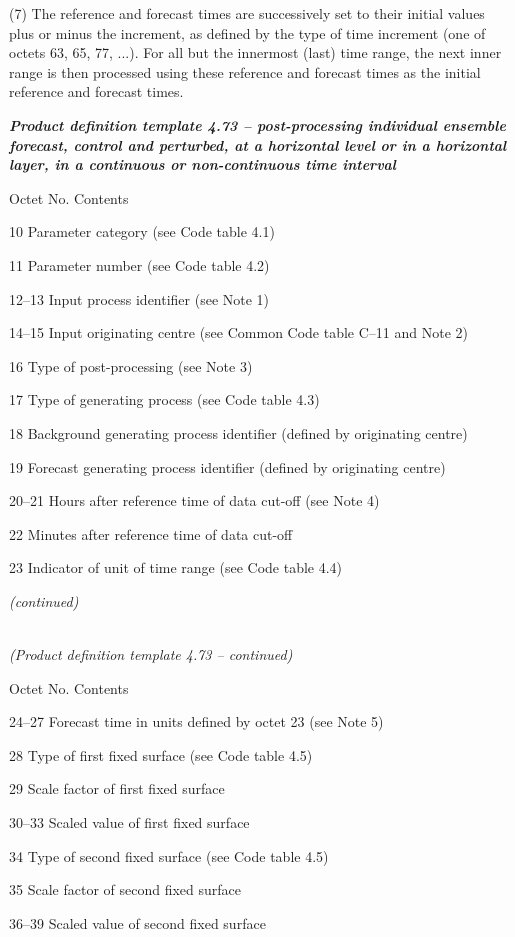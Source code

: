 (7) The reference and forecast times are successively set to their initial values plus or minus the increment, as defined by the type of time increment (one of octets 63, 65, 77, ...). For all but the innermost (last) time range, the next inner range is then processed using these reference and forecast times as the initial reference and forecast times.

\emph{\textbf{Product definition template 4.73 -- post-processing individual ensemble forecast, control and perturbed, at a horizontal level or in a horizontal layer, in a continuous or non-continuous time interval}}

Octet No. Contents

10 Parameter category (see Code table 4.1)

11 Parameter number (see Code table 4.2)

12--13 Input process identifier (see Note 1)

14--15 Input originating centre (see Common Code table C--11 and Note 2)

16 Type of post-processing (see Note 3)

17 Type of generating process (see Code table 4.3)

18 Background generating process identifier (defined by originating centre)

19 Forecast generating process identifier (defined by originating centre)

20--21 Hours after reference time of data cut-off (see Note 4)

22 Minutes after reference time of data cut-off

23 Indicator of unit of time range (see Code table 4.4)

\emph{(continued)}

\emph{\\
(Product definition template 4.73 -- continued)}

Octet No. Contents

24--27 Forecast time in units defined by octet 23 (see Note 5)

28 Type of first fixed surface (see Code table 4.5)

29 Scale factor of first fixed surface

30--33 Scaled value of first fixed surface

34 Type of second fixed surface (see Code table 4.5)

35 Scale factor of second fixed surface

36--39 Scaled value of second fixed surface


